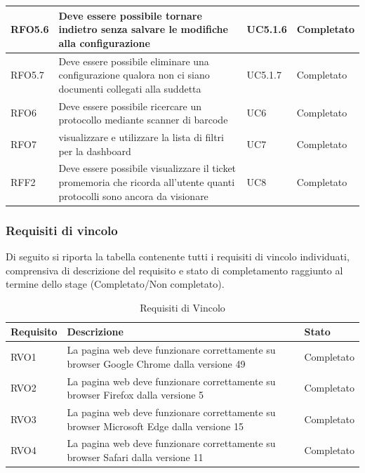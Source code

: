 \begin{longtable}{| p{3cm} | p{6cm} | p{3cm} | p{3cm} |}
        RFO5.6 & Deve essere possibile tornare indietro senza salvare le modifiche alla configurazione & UC5.1.6 & Completato
        \\ \hline
        
        RFO5.7 & Deve essere possibile eliminare una configurazione qualora non ci siano documenti collegati alla suddetta & UC5.1.7 & Completato
        \\ \hline
        
        RFO6 \label{RFO6} & Deve essere possibile ricercare un protocollo mediante scanner di barcode & UC6 & Completato
        \\ \hline
        
        RFO7 & visualizzare e utilizzare la lista di filtri per la dashboard & UC7 & Completato
        \\ \hline
        
        RFF2 & Deve essere possibile visualizzare il ticket promemoria che ricorda all'utente quanti protocolli sono ancora da visionare  & UC8 & Completato
        \\ \hline
    \end{longtable}
\newpage

\subsubsection{Requisiti di vincolo}
    Di seguito si riporta la tabella contenente tutti i requisiti di vincolo individuati, comprensiva di descrizione del requisito e stato di completamento raggiunto al termine dello stage (Completato/Non completato).
    \renewcommand{\arraystretch}{1.5}%
    \begin{longtable}{| p{3cm} | p{9cm} | p{3cm} |}
        \caption[Requisiti di Vincolo]{Requisiti di Vincolo}
        \label{tabella:req0}
        \endlastfoot
        \hline
        \textbf{Requisito} & \textbf{Descrizione} & \textbf{Stato}\\
        \hline
        \endhead
        RVO1 & La pagina web deve funzionare correttamente su browser Google Chrome dalla versione 49 & Completato 
        \\ \hline
        
        RVO2 & La pagina web deve funzionare correttamente su browser Firefox dalla versione 5 & Completato 
        \\ \hline
        
        RVO3 & La pagina web deve funzionare correttamente su browser Microsoft Edge dalla versione 15 & Completato
        \\ \hline
        
        RVO4 & La pagina web deve funzionare correttamente su browser Safari dalla versione 11 & Completato 
        \\ \hline
    \end{longtable}

